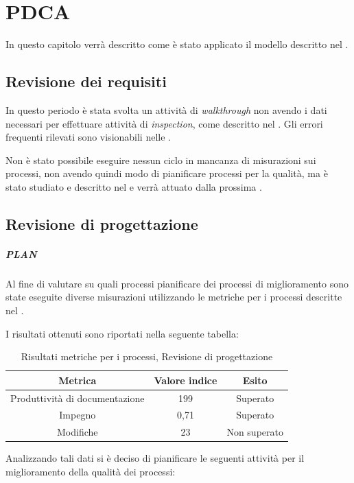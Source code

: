 \section{PDCA}
\label{appendiceQualità}
In questo capitolo verrà descritto come è stato applicato il modello  descritto nel \PianoDiQualifica.

\subsection{Revisione dei requisiti}

In questo periodo è stata svolta un attività di \emph{walkthrough} non avendo i dati necessari per effettuare attività di \emph{inspection}, come descritto nel \PianoDiQualifica. Gli errori frequenti rilevati sono visionabili nelle \NormeDiProgetto.

Non è stato possibile eseguire nessun ciclo  in mancanza di misurazioni sui processi, non avendo quindi modo di pianificare processi per la qualità, ma è stato studiato e descritto nel \PianoDiQualifica{} e verrà attuato dalla prossima .

\subsection{Revisione di progettazione}

\subparagraph{PLAN}

Al fine di valutare su quali processi pianificare dei processi di miglioramento sono state eseguite diverse misurazioni utilizzando le metriche per i processi descritte nel \PianoDiQualifica.

I risultati ottenuti sono riportati nella seguente tabella:

\begin{table}[H]
\centering
\begin{tabular}{ | c | c | c | }
\hline
\textbf{Metrica} & \textbf{Valore indice} & \textbf{Esito} \\
\hline
Produttività di documentazione & 199 & Superato \\
\hline
Impegno & 0,71 & Superato \\
\hline
Modifiche & 23 & Non superato \\
\hline
\end{tabular}
\caption{Risultati metriche per i processi, Revisione di progettazione}
\end{table}

Analizzando tali dati si è deciso di pianificare le seguenti attività per il miglioramento della qualità dei processi:

